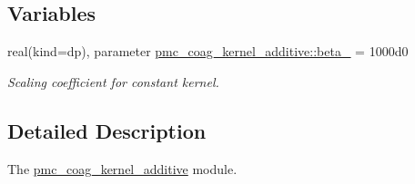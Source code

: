 \subsection*{Variables}
\begin{DoxyCompactItemize}
\item 
real(kind=dp), parameter \mbox{\hyperlink{namespacepmc__coag__kernel__additive_a79283f915c3f96c35594e8e701137c15}{pmc\+\_\+coag\+\_\+kernel\+\_\+additive\+::beta\+\_}} = 1000d0
\begin{DoxyCompactList}\small\item\em Scaling coefficient for constant kernel. \end{DoxyCompactList}\end{DoxyCompactItemize}


\subsection{Detailed Description}
The \mbox{\hyperlink{namespacepmc__coag__kernel__additive}{pmc\+\_\+coag\+\_\+kernel\+\_\+additive}} module. 

